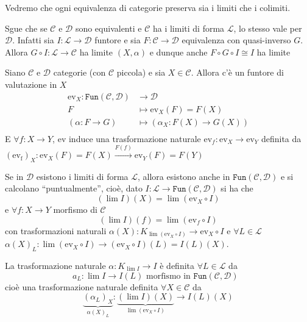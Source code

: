 \begin{remark}{}
    Vedremo che ogni equivalenza di categorie preserva sia i limiti che i
    colimiti.

    Sgue che se \(\mathcal{C}\) e \(\mathcal{D}\) sono equivalenti e \(\mathcal{C}\) ha i limiti di forma \(\mathcal{L}\), lo stesso vale per \(\mathcal{D}\). Infatti sia \(I : \mathcal{L} \to \mathcal{D}\) funtore e sia \(F : \mathcal{C} \to \mathcal{D}\) equivalenza con quasi-inverso \(G\). 
    Allora \(G \circ I : \mathcal{L} \to \mathcal{C}\) ha limite \({(X, \alpha)}\) e dunque anche \(F \circ G \circ I \cong I\) ha limite 
\end{remark}

Siano \(\mathcal{C}\) e \(\mathcal{D}\) categorie (con \(\mathcal{C}\) piccola)
e sia \(X \in \mathcal{C}\). Allora c'è un funtore di valutazione in \(X\) 
\begin{align*}
    \mathrm{ev}_X: \mathtt{Fun}{(\mathcal{C}, \mathcal{D})} &\longrightarrow
    \mathcal{D} \\
    F &\longmapsto \mathrm{ev}_X(F) = F{(X)} \\
    {(\alpha : F \to G)} &\longmapsto {(\alpha_X : F{(X)} \to G{(X)})} \\
\end{align*}
E \(\forall f : X \to Y\), \(\mathrm{ev}\) induce una trasformazione naturale
\(\mathrm{ev}_f : \mathrm{ev}_X \to \mathrm{ev}_Y\) definita da 
\({(\mathrm{ev_f})}_X : \mathrm{ev}_X{(F)} = F{(X)} \overset{F{(f)}}{\to } \mathrm{ev}_Y{(F)} = F{(Y)}\) 

\begin{proposition}{}
    Se in \(\mathcal{D}\) esistono i limiti di forma \(\mathcal{L}\), allora
    esistono anche in \(\mathtt{Fun}{(\mathcal{C}, \mathcal{D})}\) e si
    calcolano ``puntualmente'', cioè, dato \(I: \mathcal{L} \to \mathtt{Fun}{(\mathcal{C}, \mathcal{D})}\)
    si ha che 
    \[
      {( \lim I)}{(X)} =  \lim {(\mathrm{ev}_X \circ I)} %
    \]
    e \(\forall f : X \to Y\) morfismo di \(\mathcal{C}\) 
    \[
      {( \lim I)}{(f)} =  \lim {(\mathrm{ev}_f \circ I)}
    \]
    con trasformazioni naturali \(\alpha{(X)} : K_{ \lim {(\mathrm{ev}_X \circ I)}} \to \mathrm{ev}_X \circ I\) e \(\forall L \in \mathcal{L}\) \(\alpha{(X)}_L :  \lim {(\mathrm{ev}_X \circ I)} \to {(\mathrm{ev}_X \circ I)}{(L)} = I{(L)}{(X)}\).

    La trasformazione naturale \(\alpha: K_{ \lim I} \to I\) è definita \(\forall L \in \mathcal{L}\) da 
    \[
      a_L :  \lim I \to I{(L)} \text{ morfismo in \(\mathtt{Fun}{(\mathcal{C}, \mathcal{D})}\) }
    \]
    cioè una trasformazione naturale definita \(\forall X \in \mathcal{C}\) da
    \[
        \underbrace{{(\alpha_L)}_X}_{\alpha{(X)}_L} :  \underbrace{{( \lim I)}{(X)}}_{ \lim {(\mathrm{ev}_X \circ I)}} \to I{(L)}{(X)}
    \]
\end{proposition}


